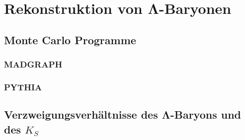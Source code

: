 \chapter{Rekonstruktion von Λ-Baryonen}
\label{sec:ergebnisse}

\section{Monte Carlo Programme}
\subsection{MADGRAPH\cite{maddy}}
%
% 

\subsection{PYTHIA\cite{pythia82}}
%
% 

\section{Verzweigungsverh\"altnisse des Λ-Baryons und des $K_{S}$}

